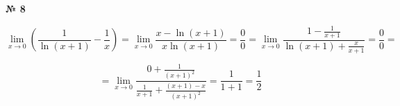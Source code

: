 \documentclass{article}
\begin{document}
\textbf{№ 8} 
\large

$$ \lim\limits_{x \to 0} \left( \frac{1}{\ln{(x+1)}} - \frac{1}{x} \right)
= \lim\limits_{x \to 0} \frac{x - \ln{(x+1)}}{x\ln{(x+1)}}
= \frac{0}{0}
= \lim\limits_{x \to 0} \frac{1 - \frac{1}{x+1}}{\ln{(x+1)} + \frac{x}{x+1}} 
= \frac{0}{0}
= $$  

$$ = \lim\limits_{x \to 0} \frac{0 + \frac{1}{(x+1)^2}}{\frac{1}{x+1} + \frac{(x+1)-x}{(x+1)^2}}
= \frac{1}{1+1}
= \frac{1}{2} $$
\end{document}
